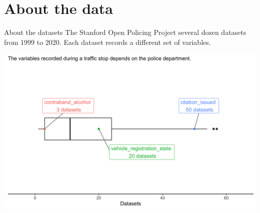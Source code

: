 \documentclass[11pt]{beamer}
\newcommand{\SMR}{\mathrm{SMR}}
\newcommand{\race}{\texttt{race}}
\newcommand{\varr}{\texttt{var}}
\begin{document}

\section{About the data}

\begin{frame}{About the datasets}
    The Stanford Open Policing Project several dozen datasets from 1999 to 2020. Each dataset records a different set of variables. \pause
    	\vspace{1ex}
	\begin{center}
	\includegraphics[scale=0.1]{fig/var_dist.png}
	\end{center} 
\end{frame}
\end{document}
